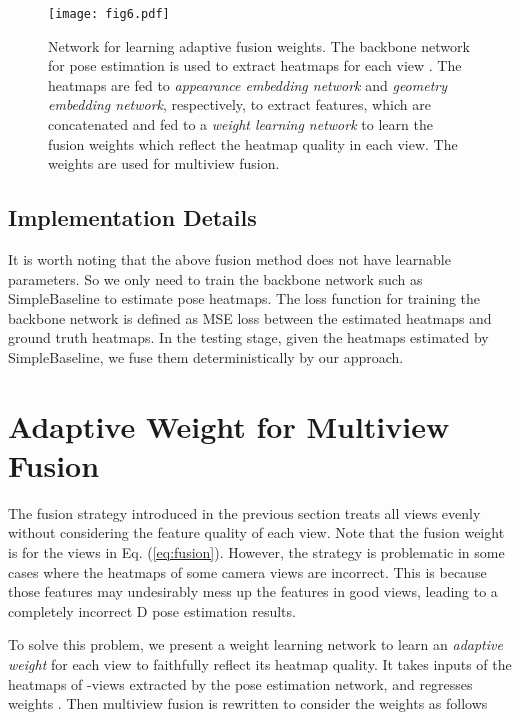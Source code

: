 \begin{figure}
    \centering
    \texttt{[image: fig6.pdf]}
    \caption{Network for learning adaptive fusion weights. The backbone network for pose estimation is used to extract heatmaps  for each view . The heatmaps are fed to \emph{appearance embedding network} and \emph{geometry embedding network}, respectively, to extract features, which are concatenated and fed to a \emph{weight learning network} to learn the fusion weights which reflect the heatmap quality in each view. The weights are used for multiview fusion. }
    \label{fig:weightlearning}
\end{figure}

\subsection{Implementation Details}
It is worth noting that the above fusion method does not have learnable parameters. So we only need to train the backbone network such as SimpleBaseline \citep{simplebaselines} to estimate pose heatmaps. The loss function for training the backbone network is defined as MSE loss between the estimated heatmaps and ground truth heatmaps. In the testing stage, given the heatmaps estimated by SimpleBaseline, we fuse them deterministically by our approach. 





\section{Adaptive Weight for Multiview Fusion}
\label{sec:weightnet}
The fusion strategy introduced in the previous section treats all views evenly without considering the feature quality of each view. Note that the fusion weight is  for the  views in Eq. (\ref{eq:fusion}). However, the strategy is problematic in some cases where the heatmaps of some camera views are incorrect. This is because those features may undesirably mess up the features in good views, leading to a completely incorrect D pose estimation results.



To solve this problem, we present a weight learning network to learn an \emph{adaptive weight} for each view to faithfully reflect its heatmap quality. It takes inputs of the heatmaps of -views extracted by the pose estimation network, and regresses  weights . Then multiview fusion is rewritten to consider the weights as follows 



